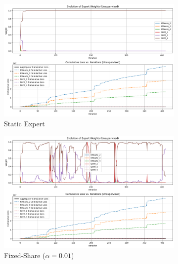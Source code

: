 \documentclass{article}
\begin{document}
    \begin{figure}[ht]
      \centering
      \begin{subfigure}[b]{0.3\textwidth}
        \includegraphics[width=\textwidth]{cloud_static.png}
        \caption{Static Expert}
        \label{fig:unsupervised_static_weights}
      \end{subfigure}
      \begin{subfigure}[b]{0.3\textwidth}
        \includegraphics[width=\textwidth]{cloud_fixed_0.01.png}
        \caption{Fixed-Share ($\alpha = 0.01$)}
        \label{fig:unsupervised_fixed_share_weights_0.01}
      \end{subfigure}
      \\
      \begin{subfigure}[b]{0.3\textwidth}

\end{subfigure}
\end{figure}
\end{document}
